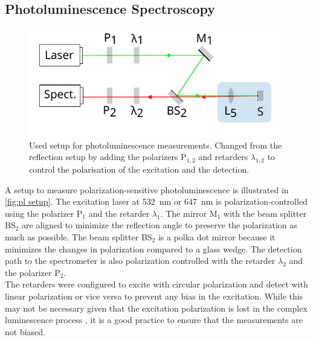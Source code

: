 \documentclass[
	twoside,
	parskip=half,
	a4paper,
]{scrbook}
\begin{document}
\subsection{Photoluminescence Spectroscopy}
\begin{figure}
	\centering
	\includegraphics{../figures/setup_simplified.pdf}
	\caption{Used setup for photoluminescence measurements. 
	Changed from the reflection setup by adding the polarizers P$_{1,2}$ and retarders $\lambda_{1,2}$ to control the polarisation of the excitation and the detection.}
	\label{fig:pl setup}
\end{figure}
A setup to measure polarization-sensitive photoluminescence is illustrated in \autoref{fig:pl setup}.
The excitation laser at \SI{532}{nm} or \SI{647}{nm} is polarization-controlled using the polarizer P$_1$ and the retarder $\lambda_1$.
The mirror M$_1$ with the beam splitter BS$_2$ are aligned to minimize the reflection angle to preserve the polarization as much as possible.
The beam splitter BS$_2$ is a polka dot mirror because it minimizes the changes in polarization compared to a glass wedge.
The detection path to the spectrometer is also polarization controlled with the retarder $\lambda_2$ and the polarizer P$_2$.\\
The retarders were configured to excite with circular polarization and detect with linear polarization or vice versa to prevent any bias in the excitation.
While this may not be necessary given that the excitation polarization is lost in the complex luminescence process \cite{NiPS3_linear}, it is a good practice to ensure that the measurements are not biased.
\end{document}
